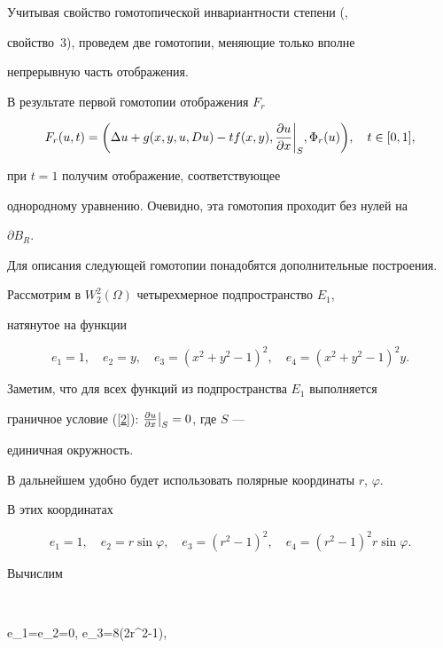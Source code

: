 Учитывая свойство гомотопической инвариантности степени (\cite{moe2},


свойство~3), проведем две гомотопии, меняющие только вполне


непрерывную часть отображения.





В результате первой гомотопии отображения $F_r$


$$


F_r(u,t)=\bigg(\Delta u+g(x,y,u,Du)-tf(x,y),


\fr{u}{x}\bigg|_S,\Phi_r(u)\bigg),\quad t\in[0,1], 


$$


при $t=1$ получим отображение, соответствующее


однородному уравнению. Очевидно, эта гомотопия проходит без нулей на


$\partial B_R$.





Для описания следующей гомотопии понадобятся дополнительные построения.





Рассмотрим в $W^2_2(\Omega)$ четырехмерное подпространство $E_1$, 


натянутое на функции 


$$


e_1=1,\quad e_2=y, \quad e_3=(x^2+y^2-1)^2, \quad e_4=(x^2+y^2-1)^2y.


$$


Заметим, что для всех функций из подпространства $E_1$ выполняется 


граничное условие (\ref{2}): $\frac {\partial u} {\partial x}\big|_S=0$, где $S$ ---


единичная окружность.





В дальнейшем удобно будет использовать полярные координаты $r$, $\varphi$. 


В этих координатах 


$$


e_1=1,\quad e_2=r\sin \varphi,\quad e_3=(r^2-1)^2,\quad 


e_4=(r^2-1)^2r\sin \varphi.


$$


Вычислим


$$


\Delta e_1=\Delta e_2=0, \quad \Delta e_3=8(2r^2-1), \quad \Delta 


